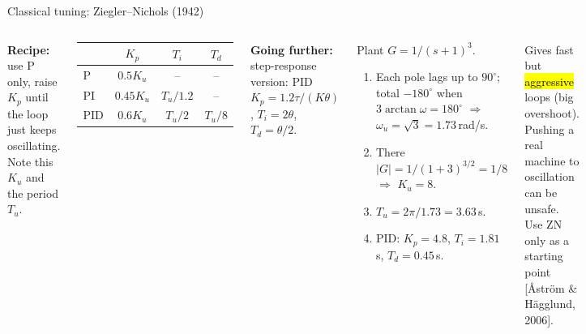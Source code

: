 \documentclass[aspectratio=169,10pt]{beamer}
\newcommand{\further}[1]{{\color{mkGray}\scriptsize\textbf{Going further:} #1}}
\begin{document}
\begin{frame}{Classical tuning: Ziegler--Nichols (1942)}
\begin{columns}[T]
\small
\textbf{Recipe:} use P only, raise $K_p$ until the loop just keeps oscillating. Note this  $K_u$ and the period $T_u$.
\begin{center}
\footnotesize
\begin{tabular}{@{}lccc@{}}
\toprule
 & $K_p$ & $T_i$ & $T_d$\\
\midrule
P & $0.5K_u$ & -- & --\\
PI & $0.45K_u$ & $T_u/1.2$ & --\\
PID & $0.6K_u$ & $T_u/2$ & $T_u/8$\\
\bottomrule
\end{tabular}
\end{center}
\further{step-response version: PID $K_p=1.2\tau/(K\theta)$, $T_i=2\theta$, $T_d=\theta/2$.}
\begin{defbox}
\footnotesize
Plant $G=1/(s+1)^3$.
\begin{enumerate}
  \item Each pole lags up to $90^\circ$; total $-180^\circ$ when $3\arctan\omega=180^\circ$ $\Rightarrow$ $\omega_u=\sqrt3=1.73$\,rad/s.
  \item There $|G|=1/(1+3)^{3/2}=1/8$ $\Rightarrow$ $K_u=8$.
  \item $T_u=2\pi/1.73=3.63$\,s.
  \item PID: $K_p=4.8$, $T_i=1.81$\,s, $T_d=0.45$\,s.
\end{enumerate}
\end{defbox}
\begin{keybox}[Caution]
\footnotesize
Gives fast but \hl{aggressive} loops (big overshoot). Pushing a real machine to oscillation can be unsafe. Use ZN only as a starting point [\AA str\"om \& H\"agglund, 2006].
\end{keybox}
\end{columns}
\end{frame}
\end{document}
